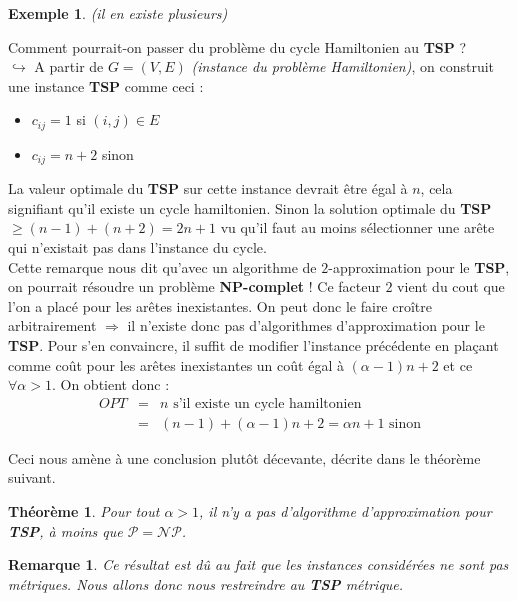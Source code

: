 \documentclass{article}
\newcommand{\titre}[1]{\textcolor{title}{#1}}
\newtheorem{exemple}{Exemple}[section]
\newtheorem{rem}{Remarque}[section]
\newtheorem{thm}{Th\'eor\`eme}[section]
\begin{document}
\begin{sffamily}
\begin{exemple}
(il en existe plusieurs)

\end{exemple}

Comment pourrait-on passer du problème du cycle Hamiltonien au \textbf{\titre{TSP}} ? \\
$\hookrightarrow$ A partir de $G=(V,E)$ \textit{(instance du problème Hamiltonien)}, on construit une instance \textbf{\titre{TSP}} comme
ceci :
\begin{itemize}
\item $c_{ij} = 1$ si $(i,j)\in E$
\item $c_{ij} = n+2$ sinon
\end{itemize}
La valeur optimale du \textbf{\titre{TSP}} sur cette instance devrait être égal à $n$, cela signifiant qu'il existe un cycle hamiltonien.
Sinon la solution optimale du \textbf{\titre{TSP}} $\geq (n-1)+(n+2) = 2n+1$ vu qu'il faut au moins sélectionner une arête qui n'existait
pas dans l'instance du cycle. \\

Cette remarque nous dit qu'avec un algorithme de $2$-approximation pour le \textbf{\titre{TSP}}, on pourrait résoudre un problème
\textbf{NP-complet} ! Ce facteur $2$ vient du cout que l'on a placé pour les arêtes inexistantes. On peut donc le faire croître
arbitrairement $\Rightarrow$ il n'existe donc pas d'algorithmes d'approximation pour le \textbf{\titre{TSP}}. Pour s'en convaincre, il
suffit de modifier l'instance précédente en plaçant comme coût pour les arêtes inexistantes un coût égal à $(\alpha-1)n+2$ et ce $\forall
\alpha>1$. On obtient donc :
\begin{eqnarray}
\nonumber OPT & = & n \text{ s'il existe un cycle hamiltonien} \\
\nonumber & = & (n-1) + (\alpha-1)n+2 = \alpha n +1 \text{ sinon}
\end{eqnarray}

Ceci nous amène à une conclusion plutôt décevante, décrite dans le théorème suivant.

\begin{thm}
Pour tout $\alpha > 1$, il n'y a pas d'algorithme d'approximation pour \textbf{\titre{TSP}}, à moins que $\mathcal{P=NP}$.
\end{thm}

\begin{rem}
Ce résultat est dû au fait que les instances considérées ne sont pas métriques. Nous allons donc nous restreindre au \textbf{\titre{TSP}}
métrique.
\end{rem}


\end{sffamily}
\end{document}
